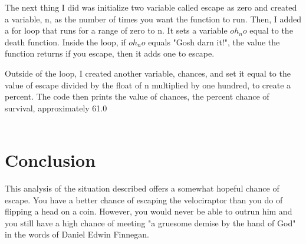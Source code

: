 \documentclass[twocolumn]{revtex4}
\begin{document}
The next thing I did was initialize two variable called escape as zero and created a variable, n, as the number of times you want the function to run. Then, I added a for loop that runs for a range of zero to n. It sets a variable $oh_no$ equal to the death function. Inside the loop, if $oh_no$ equals "Gosh darn it!", the value the function returns if you escape, then it adds one to escape.

Outside of the loop, I created another variable, chances, and set it equal to the value of escape divided by the float of n multiplied by one hundred, to create a percent. The code then prints the value of chances, the percent chance of survival, approximately 61.0%
\\
\\
\section{Conclusion}
This analysis of the situation described offers a somewhat hopeful chance of escape. You have a better chance of escaping the velociraptor than you do of flipping a head on a coin. However, you would never be able to outrun him and you still have a high chance of meeting "a gruesome demise by the hand of God" in the words of Daniel Edwin Finnegan.
\end{document}
